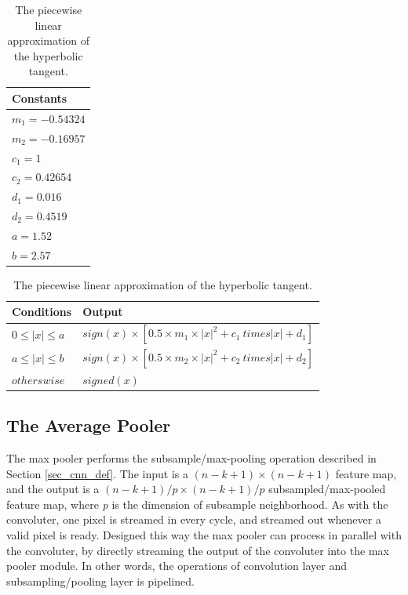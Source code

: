 \begin{table}
	\centering
    \begin{tabular}{| >{\centering\arraybackslash}m{1.2in} |} 
    \hline
    Constants \\ \hline
    $ m_1 = -0.54324 $ \\ \hline
    $ m_2 = -0.16957 $ \\ \hline
    $ c_1 = 1 $ \\ \hline
    $ c_2 = 0.42654 $ \\ \hline
    $ d_1 = 0.016 $ \\ \hline
    $ d_2 = 0.4519 $ \\ \hline
    $ a = 1.52 $ \\ \hline
    $ b = 2.57 $ \\ \hline
        \end{tabular}
    \caption{The constant used for the hyperbolic tangent approximation.}
   	\label{tab_tanh_constants}
    
	\centering
    \begin{tabular}{| >{\centering\arraybackslash}m{1.2in} | >{\centering\arraybackslash}m{2.5in} |} 
    \hline
    Conditions & Output \\ \hline
    $ 0 \le |x| \le a $ & $ sign(x) \times [0.5 \times m_1 \times |x|^2 + c_1 \ times |x| + d_1] $\\ \hline
    $ a \le |x| \le b $ & $ sign(x) \times [0.5 \times m_2 \times |x|^2 + c_2 \ times |x| + d_2] $\\ \hline
   	$ otherswise $ & $ signed(x) $\\ \hline
        \end{tabular}
    \caption{The piecewise linear approximation of the hyperbolic tangent.}
   	\label{tab_tanh}
    
\end{table}

\vspace*{1\baselineskip}
\subsection{The Average Pooler} \label{sec_average_pooler}

The max pooler performs the subsample/max-pooling operation described in Section \ref{sec_cnn_def}. The input is a $ (n-k+1) \times (n-k+1) $ feature map, and the output is a $ (n-k+1)/p \times (n-k+1)/p $ subsampled/max-pooled feature map, where \textit{p} is the dimension of subsample neighborhood. As with the convoluter, one pixel is streamed in every cycle, and streamed out whenever a valid pixel is ready. Designed this way the max pooler can process in parallel with the convoluter, by directly streaming the output of the convoluter into the max pooler module. In other words, the operations of convolution layer and subsampling/pooling layer is pipelined.

